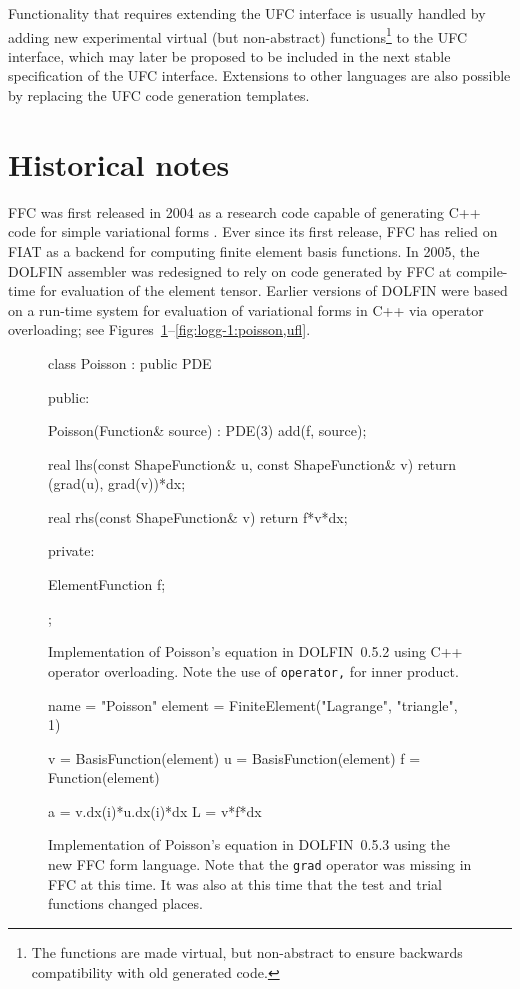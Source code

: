 Functionality that requires extending the UFC interface is usually
handled by adding new experimental virtual (but non-abstract)
functions\footnote{The functions are made virtual, but non-abstract to
  ensure backwards compatibility with old generated code.} to the UFC
interface, which may later be proposed to be included in the next
stable specification of the UFC interface. Extensions to other
languages are also possible by replacing the UFC code generation
templates.

\section{Historical notes}

FFC was first released in 2004 as a research code capable of
generating C++ code for simple variational forms
\citep{KirbyLogg2006,KirbyLogg2007}. Ever since its first release,
FFC has relied on FIAT as a backend for computing finite element basis
functions. In 2005, the DOLFIN assembler was redesigned to rely on
code generated by FFC at compile-time for evaluation of the element
tensor. Earlier versions of DOLFIN were based on a run-time system for
evaluation of variational forms in C++ via operator overloading; see
Figures~\ref{fig:logg-1:poisson,before}--\ref{fig:logg-1:poisson,ufl}.

\begin{figure}
\bwfig
\begin{c++}
class Poisson : public PDE
{
public:

  Poisson(Function& source) : PDE(3)
  {
    add(f, source);
  }

  real lhs(const ShapeFunction& u,
           const ShapeFunction& v)
  {
    return (grad(u), grad(v))*dx;
  }

  real rhs(const ShapeFunction& v)
  {
    return f*v*dx;
  }

private:

  ElementFunction f;

};
\end{c++}
  \caption{Implementation of Poisson's equation in DOLFIN~0.5.2 using C++ operator overloading.
           Note the use of \texttt{operator,} for inner product.}
  \label{fig:logg-1:poisson,before}
\end{figure}

\begin{figure}
\bwfig
\begin{python}
name = "Poisson"
element = FiniteElement("Lagrange", "triangle", 1)

v = BasisFunction(element)
u = BasisFunction(element)
f = Function(element)

a = v.dx(i)*u.dx(i)*dx
L = v*f*dx
\end{python}
\caption{Implementation of Poisson's equation in DOLFIN~0.5.3 using
  the new FFC form language. Note that the \texttt{grad} operator
  was missing in FFC at this time. It was also at this time that the
  test and trial functions changed places.}
\label{fig:logg-1:poisson,after}
\end{figure}

